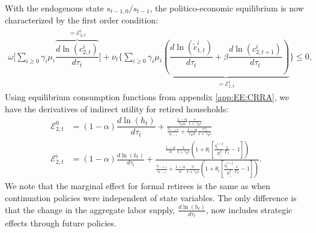 With the endogenous state $s_{t-1,0}/s_{t-1}$, the politico-economic equilibrium is now characterized by the first order condition:
\begin{align*}
    \omega\Bigg[\sum_{i\geq0}\gamma_i\mu_i \overbrace{\dfrac{d \ln\left(c_{2,t}^i\right)}{d \tau_t}}^{= \mathcal{E}_{2,t}^i}\Bigg]+
  \nu_t\Bigg\lbrace \sum_{i\geq 0}\gamma_i\mu_i\underbrace{\left(\dfrac{d \ln\left(\tilde{c}_{1,t}^i\right)}{d \tau_t}+\beta\dfrac{d \ln\left(c_{2,t+1}^i\right)}{d \tau_t}\right)}_{= \mathcal{E}_{1,t}^i}\Bigg\rbrace \leq 0,
\end{align*}
Using equilibrium consumption functions from appendix \ref{app:EE:CRRA}, we have the derivatives of indirect utility for retired households:
\begin{align}
    \mathcal{E}_{2,t}^0 & = (1-\alpha)\dfrac{d\ln\left(h_t\right)}{d\tau_t}+\frac{\frac{1-\alpha}{r_0\alpha}\frac{\epsilon}{1+\gamma_0\epsilon}}{\frac{s_{t-1,0}}{s_{t-1}}+\frac{1-\alpha}{r_0\alpha}\frac{\epsilon\tau_t}{1+\gamma_0\epsilon}} \\ 
    \mathcal{E}_{2,t}^i &=(1-\alpha)\frac{d\ln\left(h_t\right)}{d\tau_t}+\frac{\frac{1-\alpha}{\alpha}\frac{1}{1+\gamma_0\epsilon}\left(1+\theta_t\left[\frac{\eta_{i}^{1+\xi}}{X_{i}^{\xi}}\frac{1}{\Gamma_{h}}-1\right]\right)}{\frac{s_{t-1,i}}{s_{t-1}}+\frac{1-\alpha}{\alpha}\frac{\tau_t}{1+\gamma_0\epsilon}\left(1+\theta_t\left[\frac{\eta_{i}^{1+\xi}}{X_{i}^{\xi}}\frac{1}{\Gamma_{h}}-1\right]\right)}.
\end{align}
We note that the marginal effect for formal retirees is the same as when continuation policies were independent of state variables. The only difference is that the change in the aggregate labor supply, $\frac{d\ln\left(h_t\right)}{d\tau_t}$, now includes strategic effects through future policies. 

